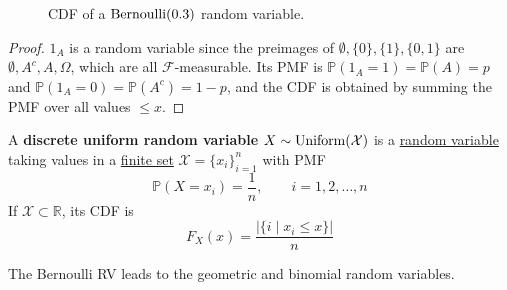\begin{definition}
\begin{center}
    \hfill 
    \begin{subfigure}[b]{0.48\textwidth}
      \centering
      \caption{CDF of a $\Bernoulli(0.3)$ random variable.}
      \label{fig:bernoulli-cdf}
    \end{subfigure}
    \caption{The PMF and CDF of a $\Bernoulli(0.3)$ random variable.}
    \label{fig:bernoulli}
  \end{center}
  \end{definition}
  \begin{proof}
    $1_A$ is a random variable since the preimages of $\emptyset, \{0\}, \{1\}, \{0, 1\}$ are $\emptyset, A^c, A, \Omega$, which are all $\mathcal{F}$-measurable. Its PMF is $\mathbb{P}(1_A = 1) = \mathbb{P}(A) = p$ and $\mathbb{P}(1_A = 0) = \mathbb{P}(A^c) = 1 - p$, and the CDF is obtained by summing the PMF over all values $\leq x$. 
  \end{proof}

  \begin{definition}
    \label{def:uniform-random-variable}
    A \textbf{discrete uniform random variable} $X \sim \operatorname{Uniform}(\mathcal{X})$ is a \hyperref[def:discrete-random-variable]{random variable} taking values in a \hyperref[st-def:finite-set]{finite set} $\mathcal{X} = \{x_i\}_{i=1}^n$ with PMF 
    \begin{equation}
      \mathbb{P}(X = x_i) = \frac{1}{n}, \qquad i = 1, 2, \ldots, n
    \end{equation}
    If $\mathcal{X} \subset \mathbb{R}$, its CDF is 
    \begin{equation}
      F_X (x) = \frac{\big| \{ i \mid x_i \leq x \} \big|}{n}
    \end{equation}
  \end{definition}

  The Bernoulli RV leads to the geometric and binomial random variables. 

